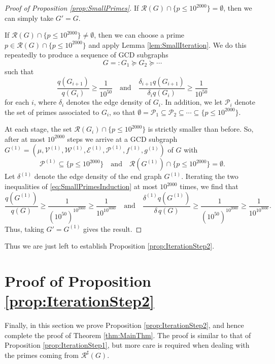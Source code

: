 \documentclass[12pt]{amsart}
\numberwithin{equation}{section}
\theoremstyle{definition}
\theoremstyle{remark}
\newcommand{\CE}{\mathcal{E}}
\newcommand{\CP}{\mathcal{P}}
\newcommand{\CR}{\mathcal{R}}
\newcommand{\CV}{\mathcal{V}}
\newcommand{\CW}{\mathcal{W}}
\renewcommand{\le}{\leqslant}
\renewcommand{\ge}{\geqslant}
\begin{document}
\begin{proof}[Proof of Proposition \ref{prop:SmallPrimes}]
If $\CR(G)\cap\{p\le 10^{2000}\}=\emptyset$, then we can simply take $G'=G$.

If $\CR(G)\cap\{p\le 10^{2000}\}\ne\emptyset$, then we can choose a prime $p\in\CR(G)\cap\{p\le 10^{2000}\}$ and apply Lemma \ref{lem:SmallIteration}. We do this repeatedly to produce a sequence of GCD subgraphs 
\[
G=:G_1\succeq G_2\succeq\cdots
\]
such that
\begin{equation}\label{eq:SmallPrimesInduction}
\frac{q(G_{i+1})}{q(G_i)}\ge\frac{1}{10^{50}}
\quad\text{and}\quad \frac{\delta_{i+1}q(G_{i+1})}{\delta_iq(G_i)}\ge\frac{1}{10^{50}}
\end{equation}
for each $i$, where $\delta_i$ denotes the edge density of $G_i$. In addition, we let $\CP_i$ denote the set of primes associated to $G_i$, so that $\emptyset=\CP_1\subseteq\CP_2\subseteq\cdots \subseteq\{p\le 10^{2000}\}$. 

At each stage, the set $\CR(G_i)\cap\{p\le 10^{2000}\}$ is strictly smaller than before. So, after at most $10^{2000}$ steps we arrive at a GCD subgraph $G^{(1)}=(\mu,\CV^{(1)},\CW^{(1)},\CE^{(1)},\CP^{(1)},f^{(1)},g^{(1)})$ of $G$ with 
\[
\CP^{(1)}\subseteq\{p\le 10^{2000}\}
\quad\text{and}\quad \CR(G^{(1)})\cap\{p\le 10^{2000}\}=\emptyset.
\]
Let $\delta^{(1)}$ denote the edge density of the end graph $G^{(1)}$. Iterating the two inequalities of \eqref{eq:SmallPrimesInduction} at most $10^{2000}$ times, we find that
\[
\frac{q(G^{(1)})}{q(G)}\ge \frac{1}{(10^{50})^{10^{2000}}}\ge \frac{1}{10^{10^{3000}}}
\quad\text{and}\quad 
\frac{\delta^{(1)}q(G^{(1)})}{\delta\,q(G)}
\ge \frac{1}{(10^{50})^{10^{2000}}}\ge \frac{1}{10^{10^{3000}}}.
\] 
Thus, taking $G'=G^{(1)}$ gives the result.
\end{proof}

Thus we are just left to establish Proposition \ref{prop:IterationStep2}.






\section{Proof of Proposition \ref{prop:IterationStep2}}\label{sec:IterationStep2}

Finally, in this section we prove Proposition \ref{prop:IterationStep2}, and hence complete the proof of Theorem \ref{thm:MainThm}. The proof is similar to that of Proposition \ref{prop:IterationStep1}, but more care is required when dealing with the primes coming from $\CR^{\sharp}(G)$.
\end{document}
